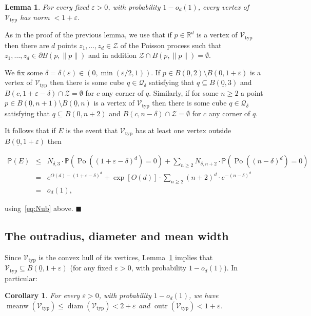 \documentclass[11pt]{article}%
\newenvironment{proof}{\vspace{1ex}\noindent{\bf Proof.}}{\hspace*{\fill}$\blacksquare$\vspace{1ex}}
\newtheorem{lemma} [theorem] {Lemma}%
\newtheorem{corollary} [theorem] {Corollary}%
\newcommand{\Qcal}[0]{\ensuremath{{\mathcal Q}}}
\newcommand{\Vcal}[0]{\ensuremath{{\mathcal V}}}
\newcommand{\Zcal}[0]{\ensuremath{{\mathcal Z}}}
\newcommand{\eR}[0]{\ensuremath{ \mathbb R}}
\newcommand{\norm}[1]{\ensuremath{\|#1\|}}
\newcommand{\Pee}[0]{\ensuremath{{\mathbb P}}}
\newcommand{\eps}{\varepsilon}
\newcommand{\orig}{\underline{0}}
\DeclareMathOperator{\diam}{diam}
\DeclareMathOperator{\Po}{Po}
\DeclareMathOperator{\outr}{outr}
\DeclareMathOperator{\meanw}{meanw}
\newcommand{\Vtyp}[0]{\Vcal_{\text{typ}}}
\begin{document}
\begin{lemma}\label{lem:vertub}
For every fixed $\eps>0$, with probability $1-o_d(1)$, every vertex of $\Vtyp$ has norm $<1+\eps$. 
\end{lemma}

\begin{proof}
 As in the proof of the previous lemma, we use that if $p \in \eR^d$ is a vertex of $\Vtyp$ then 
 there are $d$ points $z_1,\dots,z_d \in \Zcal$ of the Poisson process such that 
 $z_1,\dots,z_d \in \partial B(p, \norm{p})$ and in addition $\Zcal \cap B(p, \norm{p}) = \emptyset$.
 
 We fix some $\delta=\delta(\eps) \in (0,\min(\eps/2,1))$.
 If $p \in B(\orig,2) \setminus B(\orig,1+\eps)$ is a vertex of $\Vtyp$ then 
 there is some cube $q \in \Qcal_\delta$ satisfying that $q \subseteq B(\orig,3)$ and 
 $B(c,1+\eps-\delta) \cap \Zcal = \emptyset$ for $c$ any corner of $q$.
 Similarly, if for some $n\geq 2$ a point $p \in B(\orig,n+1) \setminus B(\orig,n)$ is 
 a vertex of $\Vtyp$ then 
 there is some cube $q \in \Qcal_\delta$ satisfying that $q \subseteq B(\orig,n+2)$ and 
 $B(c,n-\delta) \cap \Zcal = \emptyset$ for $c$ any corner of $q$.
 
 It follows that if $E$ is the event that $\Vtyp$ has at least one vertex outside $B(\orig,1+\eps)$ then 
 
 $$ \begin{array}{rcl} \Pee(E) & \leq & N_{\delta,3} \cdot \Pee( \Po( (1+\eps-\delta)^d ) = 0 ) 
 + \sum_{n\geq 2} N_{\delta,n+2} \cdot \Pee( \Po( (n-\delta)^d ) = 0 ) \\
& = & e^{O(d) - (1+\eps-\delta)^d} 
+ \exp[ O(d) ] \cdot \sum_{n\geq 2} (n+2)^d \cdot  e^{-(n-\delta)^d} \\
& = & o_d(1),
\end{array} $$

\noindent
using~\eqref{eq:Nub} above.
\end{proof}


\subsection{The outradius, diameter and mean width}


Since $\Vtyp$ is the convex hull of its vertices, Lemma~\ref{lem:vertub} implies that 
$\Vtyp \subseteq B(\orig,1+\eps)$ (for any fixed $\eps>0$, with probability $1-o_d(1)$). 
In particular:

\begin{corollary}\label{cor:twaalf}
For every $\eps>0$, with probability $1-o_d(1)$, we have $\meanw(\Vtyp)\leq \diam(\Vtyp) < 2+\eps$ and $\outr(\Vtyp) < 1+\eps$.
\end{corollary}
\end{document}
